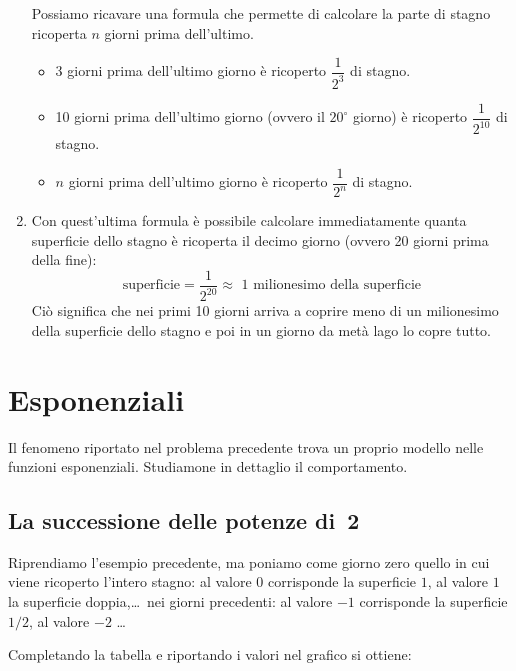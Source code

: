 \begin{enumerate}
Possiamo ricavare una formula che permette di calcolare la parte di 
stagno ricoperta \(n\) giorni prima dell'ultimo.
\begin{itemize}
 \item 3 giorni prima dell'ultimo giorno è ricoperto \(\dfrac{1}{2^3}\) di 
stagno.
 \item 10 giorni prima dell'ultimo giorno (ovvero il \(20^\circ\) giorno) è 
ricoperto \(\dfrac{1}{2^{10}}\) di stagno.
 \item \(n\) giorni prima dell'ultimo giorno è ricoperto 
\(\dfrac{1}{2^{n}}\) di stagno.
\end{itemize}

\item Con quest'ultima formula è possibile calcolare immediatamente quanta 
superficie dello stagno è ricoperta il decimo giorno (ovvero 20 giorni 
prima della fine):
\[\text{superficie} = \dfrac{1}{2^{20}} \approx 
\text{ 1 milionesimo della superficie}\]
Ciò significa che nei primi 10 giorni arriva a coprire meno di un 
milionesimo 
della superficie dello stagno e poi in un giorno da metà lago lo copre 
tutto.
\end{enumerate}

\section{Esponenziali}
\label{sec:esplog_esponenziali}

Il fenomeno riportato nel problema precedente trova un proprio modello 
nelle 
funzioni esponenziali. Studiamone in dettaglio il comportamento.

\subsection{La successione delle potenze di~2}
\label{subsec:esplog_succpotdue}

Riprendiamo l'esempio precedente, ma poniamo come giorno zero quello in cui 
viene ricoperto l'intero stagno: 
al valore \(0\) corrisponde la superficie \(1\), 
al valore \(1\) la superficie doppia,\dots\ 
nei giorni precedenti: al valore \(-1\) corrisponde la superficie \(1/2\), 
al valore \(-2\) \dots

Completando la tabella e riportando i valori nel grafico si ottiene:

